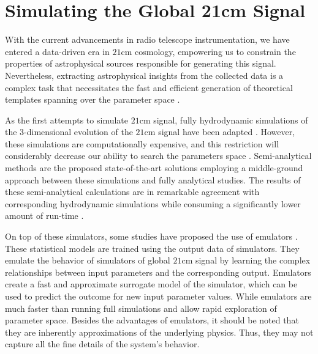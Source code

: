 \documentclass[12pt, TexShade, letterpaper]{report}
\begin{document}
\section{Simulating the Global 21cm Signal}
With the current advancements in radio telescope instrumentation, we have entered a data-driven era in $\mathrm{21cm}$ cosmology, empowering us to constrain the properties of astrophysical sources responsible for generating this signal. Nevertheless, extracting astrophysical insights from the collected data is a complex task that necessitates the fast and efficient generation of theoretical templates spanning over the parameter space \cite{emulate_21cm}. \par
As the first attempts to simulate $\mathrm{21cm}$ signal, fully hydrodynamic simulations of the 3-dimensional evolution of the $\mathrm{21cm}$ signal have been adapted \cite{hydrodynamic_sim}. However, these simulations are computationally expensive, and this restriction will considerably decrease our ability to search the parameters space \cite{ares2014jordan}. 
Semi-analytical methods are the proposed state-of-the-art solutions employing a middle-ground approach between these simulations and fully analytical studies. The results of these semi-analytical calculations are in remarkable agreement with corresponding hydrodynamic simulations while consuming a significantly lower amount of run-time \cite{semi_analytic_1, semi_analytic_2, semi_analytic_3, semi_analytic_4, semi-analytic_5}. \par
On top of these simulators, some studies have proposed the use of emulators \cite{emulate_21cm, emulate_21cm_2, emulate_21cm_3}. These statistical models are trained using the output data of simulators. They emulate the behavior of simulators of global $\mathrm{21cm}$ signal by learning the complex relationships between input parameters and the corresponding output. Emulators create a fast and approximate surrogate model of the simulator, which can be used to predict the outcome for new input parameter values. While emulators are much faster than running full simulations and allow rapid exploration of parameter space. Besides the advantages of emulators, it should be noted that they are inherently approximations of the underlying physics. Thus, they may not capture all the fine details of the system's behavior.\par
\end{document}
